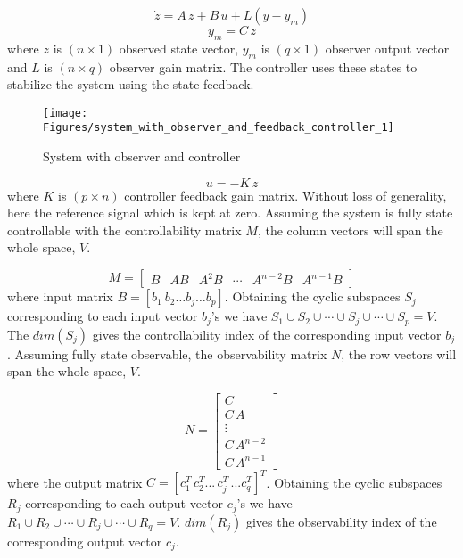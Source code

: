 \documentclass{elsarticle}
\numberwithin{equation}{section}
\begin{document}
\begin{equation} \label{modelstate}
	\dot{z}=A\,z + B\,u +L(y-y_m)
\end{equation}
\vspace{-.5cm}
\begin{equation} \label{modeloutput}
	y_m = C\,z
\end{equation}
where $z$ is $(n \times 1)$ observed state vector, $y_m$ is $(q \times 1)$ observer output vector and $L$ is $(n \times q)$ observer gain matrix. The controller uses these states to stabilize the system using the state feedback. 

\begin{figure}[!ht]
\begin{center}
\texttt{[image: Figures/system\_with\_observer\_and\_feedback\_controller\_1]}
\caption{System with observer and controller}
\label{systemfigure}
\end{center}
\end{figure}

\begin{equation} \label{controllergain}
	u = -K\,z
\end{equation}
where $K$ is $(p \times n)$ controller feedback gain matrix. Without loss of generality, here the reference signal which is kept at zero. Assuming the system is fully state controllable with the controllability matrix $M$, the column vectors will span the whole space\cite{KALMAN1960491}, $V$.

\begin{equation}\label{controllability}
	M=\begin{bmatrix}
	B & AB & A^2B & \cdots & A^{n-2}B & A^{n-1}B
	\end{bmatrix}
\end{equation}
where input matrix $B= \left[ b_1\ b_2 \ldots b_j \ldots b_p \right]$. Obtaining the cyclic subspaces $S_j$ corresponding to each input vector $b_j$'s we have $S_1 \cup S_2 \cup \cdots \cup S_j \cup \cdots \cup S_p = V$. The $dim(S_j)$ gives the controllability index of the corresponding input vector $b_j$. Assuming fully state observable, the observability matrix $N$, the row vectors will span the whole space\cite{KALMAN1960491}, $V$.

\begin{equation}
	N=\begin{bmatrix}
	C \\ C\,A \\ \vdots \\ C\,A^{n-2} \\ C\,A^{n-1}
	\end{bmatrix}
\end{equation}
where the output matrix $C=\left[c^T_1\,c^T_2...\,c^T_j\,...c^T_q\right]^T$. Obtaining the cyclic subspaces $R_j$ corresponding to each output vector $c_j$'s we have $R_1 \cup R_2 \cup \cdots \cup R_j \cup \cdots \cup R_q = V$. $dim(R_j)$ gives the observability index of the corresponding output vector $c_j$.
\end{document}
